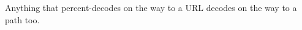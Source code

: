 \begin{lemma}\label{hx/0004\%2e\%2e}
Anything that percent-decodes on the way to a URL decodes on the way to a path too.
\end{lemma}